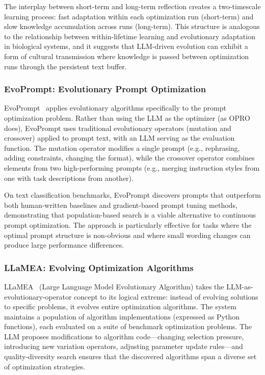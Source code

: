 The interplay between short-term and long-term reflection creates a two-timescale learning process: fast adaptation within each optimization run (short-term) and slow knowledge accumulation across runs (long-term). This structure is analogous to the relationship between within-lifetime learning and evolutionary adaptation in biological systems, and it suggests that LLM-driven evolution can exhibit a form of cultural transmission where knowledge is passed between optimization runs through the persistent text buffer.

\subsubsection{EvoPrompt: Evolutionary Prompt Optimization}

EvoPrompt~\citep{evoprompt2023} applies evolutionary algorithms specifically to the prompt optimization problem. Rather than using the LLM as the optimizer (as OPRO does), EvoPrompt uses traditional evolutionary operators (mutation and crossover) applied to prompt text, with an LLM serving as the evaluation function. The mutation operator modifies a single prompt (e.g., rephrasing, adding constraints, changing the format), while the crossover operator combines elements from two high-performing prompts (e.g., merging instruction styles from one with task descriptions from another).

On text classification benchmarks, EvoPrompt discovers prompts that outperform both human-written baselines and gradient-based prompt tuning methods, demonstrating that population-based search is a viable alternative to continuous prompt optimization. The approach is particularly effective for tasks where the optimal prompt structure is non-obvious and where small wording changes can produce large performance differences.

\subsubsection{LLaMEA: Evolving Optimization Algorithms}

LLaMEA~\citep{llamea2024} (Large Language Model Evolutionary Algorithm) takes the LLM-as-evolutionary-operator concept to its logical extreme: instead of evolving solutions to specific problems, it evolves entire optimization algorithms. The system maintains a population of algorithm implementations (expressed as Python functions), each evaluated on a suite of benchmark optimization problems. The LLM proposes modifications to algorithm code---changing selection pressure, introducing new variation operators, adjusting parameter update rules---and quality-diversity search ensures that the discovered algorithms span a diverse set of optimization strategies.

